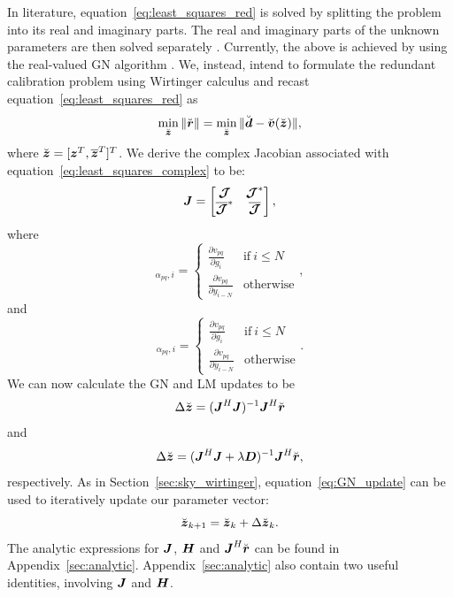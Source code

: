 \documentclass[useAMS,usenatbib]{mn2e}
\newcommand{\bz}{\bmath{z}}
\newcommand{\br}{\bmath{r}}
\newcommand{\bd}{\bmath{d}}
\newcommand{\bv}{\bmath{v}}
\newcommand{\bJ}{\bmath{J}}
\newcommand{\bD}{\bmath{D}}
\newcommand{\bH}{\bmath{H}}
\newcommand{\bmJ}{\bmath{\mathcal{J}}}
\newcommand{\conj}[1]{\overline{#1}}
\begin{document}
In literature, equation~\ref{eq:least_squares_red} is solved by splitting the problem into its real and imaginary parts. The real and imaginary parts of the unknown parameters are then solved separately \citep{Wieringa1992,Liu2010,Zheng2014}. 
Currently, the above is achieved by using the real-valued GN algorithm \citep{Kurien2016}. 
We, instead, intend to formulate the redundant calibration problem using Wirtinger calculus and recast equation~\ref{eq:least_squares_red} as
\begin{equation}
\label{eq:least_squares_complex}
\min_{\breve{\bz}} \|\breve{\br}\| = \min_{\breve{\bz}} \|\breve{\bd} - \breve{\bv}(\breve{\bz})\|, 
\end{equation}
where $\breve{\bz} = [\bz^T,\conj{\bz}^T]^T$. 
We derive the complex Jacobian associated with equation~\ref{eq:least_squares_complex} to be:
\begin{equation}
\label{eq:Jacobian}
\bJ = \begin{bmatrix}
       \bmJ & \bmJ^*\\
       \conj{\bmJ}^* & \conj{\bmJ} 
      \end{bmatrix},
\end{equation}
where 
\begin{equation}
[\bmJ]_{\alpha_{pq},i} = \begin{cases} 
     \frac{\partial v_{pq}}{\partial g_i} & \textrm{if}~i\leq N \\
     \frac{\partial v_{pq}}{\partial y_{i-N}} & \textrm{otherwise}  
\end{cases}, %
\end{equation}
and
\begin{equation}
[\bmJ^*]_{\alpha_{pq},i} = \begin{cases} 
     \frac{\partial v_{pq}}{\partial \conj{g}_i} & \textrm{if}~i\leq N \\
     \frac{\partial v_{pq}}{\partial \conj{y}_{i-N}} & \textrm{otherwise}  
\end{cases}. %
\end{equation}
We can now calculate the GN and LM updates to be 
\begin{equation}
\label{eq:GN_update}
\Delta \breve{\bz} = (\bJ^H\bJ)^{-1}\bJ^H\breve{\br}
\end{equation}
and 
\begin{equation}
\label{eq:LM_update}
\Delta \breve{\bz} = (\bJ^H\bJ + \lambda\bD)^{-1}\bJ^H\breve{\br},
\end{equation}
respectively. As in Section~\ref{sec:sky_wirtinger}, equation~\ref{eq:GN_update} can be used to iteratively update our parameter vector:
\begin{equation}
\label{eq:update}
\breve{\bz}_{k+1} = \breve{\bz}_{k} + \Delta \breve{\bz}_{k}. 
\end{equation}
The analytic expressions for $\bJ$, $\bH$ and $\bJ^H\breve{\br}$ can be found in Appendix~\ref{sec:analytic}.
Appendix~\ref{sec:analytic} also contain two useful identities, involving $\bJ$ and $\bH$. 
\end{document}
